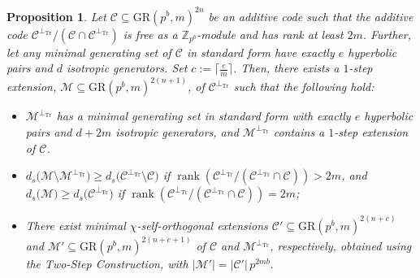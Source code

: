 \documentclass{article}
\DeclareMathOperator{\Tr}{Tr}
\DeclareMathOperator{\rank}{rank}
\newtheorem{prop}{Proposition}[section]
\theoremstyle{remark}
\theoremstyle{definition}
\numberwithin{equation}{section}
\begin{document}
\begin{prop} \label{prop:extsame}
Let $\mathcal{C} \subseteq \text{GR}(p^b,m)^{2n}$ be an additive code such that the additive code $\mathcal{C}^{\perp_{\Tr}}/(\mathcal{C}  \cap  \mathcal{C}^{\perp_{\Tr}})$ is free as a $\mathbb{Z}_{p^b}$-module and has  rank at least  $2m$. Further, let any minimal generating set of $\mathcal{C}$ in standard form have exactly $e$ hyperbolic pairs and $d$ isotropic generators. Set $c := \lceil \frac{e}{m}\rceil$.   Then, there exists a $1$-step extension, $\mathcal{M} \subseteq \text{GR}(p^b,m)^{2(n+1)}$, of $\mathcal{C}^{\perp_{\Tr}}$ such that the following hold:
\begin{itemize}
\item[(i)]  $\mathcal{M}^{\perp_{\Tr}}$ has a minimal generating set in standard form with exactly $e$ hyperbolic pairs and $d+2m$ isotropic generators, and $\mathcal{M}^{\perp_{\Tr}}$ contains a $1$-step extension of $\mathcal{C}$.
  \item[(ii)] $d_s\bigl({\mathcal{M}} \setminus \mathcal{M}^{\perp_{\Tr}}\bigr) \ge d_s\bigl({\mathcal{C}}^{\perp_{\Tr}} \setminus \mathcal{C}\bigr)$
   if $\rank(\mathcal{C}^{\perp_{\Tr}}/(\mathcal{C}^{\perp_{\Tr}} \cap \mathcal{C})) > 2m$, and 
   $d_s\bigl({\mathcal{M}} \bigr) \geq  d_s\bigl({\mathcal{C}}^{\perp_{\Tr}} \bigr)$ if $\rank(\mathcal{C}^{\perp_{\Tr}}/(\mathcal{C}^{\perp_{\Tr}} \cap \mathcal{C})) = 2m$;
  \item[(iii)] There exist minimal $\chi$-self-orthogonal extensions  $\mathcal{C}'\subseteq \text{GR}(p^b,m)^{2(n+c)}$  and $\mathcal{M}'\subseteq \text{GR}(p^b,m)^{2(n+c+1)}$ of $\mathcal{C}$ and $\mathcal{M}^{\perp_{\Tr}}$, respectively,  obtained using the Two-Step Construction, with $|\mathcal{M}'|=|\mathcal{C}'| \,p^{2mb}.$ 
 \end{itemize}
\end{prop}
%
\end{document}
